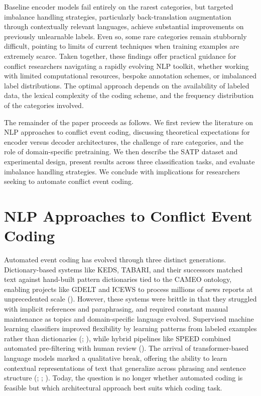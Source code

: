 \documentclass[
  11pt,
]{article}
\begin{document}
Baseline encoder models fail entirely on the rarest categories, but
targeted imbalance handling strategies, particularly back-translation
augmentation through contextually relevant languages, achieve
substantial improvements on previously unlearnable labels. Even so, some
rare categories remain stubbornly difficult, pointing to limits of
current techniques when training examples are extremely scarce. Taken
together, these findings offer practical guidance for conflict
researchers navigating a rapidly evolving NLP toolkit, whether working
with limited computational resources, bespoke annotation schemes, or
imbalanced label distributions. The optimal approach depends on the
availability of labeled data, the lexical complexity of the coding
scheme, and the frequency distribution of the categories involved.

The remainder of the paper proceeds as follows. We first review the
literature on NLP approaches to conflict event coding, discussing
theoretical expectations for encoder versus decoder architectures, the
challenge of rare categories, and the role of domain-specific
pretraining. We then describe the SATP dataset and experimental design,
present results across three classification tasks, and evaluate
imbalance handling strategies. We conclude with implications for
researchers seeking to automate conflict event coding.

\section{NLP Approaches to Conflict Event
Coding}\label{nlp-approaches-to-conflict-event-coding}

Automated event coding has evolved through three distinct generations.
Dictionary-based systems like KEDS, TABARI, and their successors matched
text against hand-built pattern dictionaries tied to the CAMEO ontology,
enabling projects like GDELT and ICEWS to process millions of news
reports at unprecedented scale (). However, these systems were brittle in that they struggled with
implicit references and paraphrasing, and required constant manual
maintenance as topics and domain-specific language evolved. Supervised
machine learning classifiers improved flexibility by learning patterns
from labeled examples rather than dictionaries
(;
), while hybrid
pipelines like SPEED combined automated pre-filtering with human review
(). The
arrival of transformer-based language models marked a qualitative break,
offering the ability to learn contextual representations of text that
generalize across phrasing and sentence structure
(;
;
). Today, the question is no longer
whether automated coding is feasible but which architectural approach
best suits which coding task.
\end{document}
